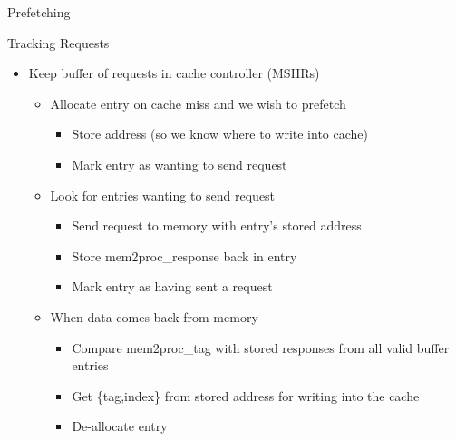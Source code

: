 \documentclass[table,dvipsnames]{beamer}
\begin{document}
\begin{frame}[fragile]{Prefetching}
	\begin{block}{Tracking Requests}
	\begin{itemize}
		\item Keep buffer of requests in cache controller (MSHRs)
		\begin{itemize} \item Allocate entry on cache miss and we wish to prefetch
			\begin{itemize} \item Store address (so we know where to write into cache)
					\item Mark entry as wanting to send request
			\end{itemize}
			\item Look for entries wanting to send request
			\begin{itemize}
				\item Send request to memory with entry's stored address
				\item Store mem2proc\_response back in entry
				\item Mark entry as having sent a request
			\end{itemize}
			\item When data comes back from memory
			\begin{itemize}
				\item Compare mem2proc\_tag with stored responses from all valid buffer entries
				\item Get \{tag,index\} from stored address for writing into the cache
				\item De-allocate entry
			\end{itemize}
		\end{itemize}
	\end{itemize}

	\end{block}	
\end{frame}
\end{document}
